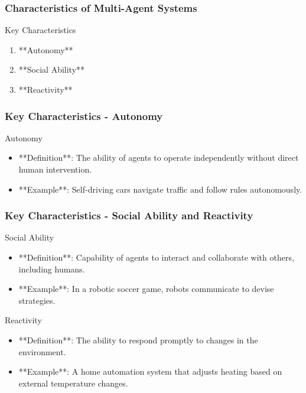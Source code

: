 \documentclass[aspectratio=169]{beamer}
\begin{document}
\begin{frame}[fragile]
    \frametitle{Characteristics of Multi-Agent Systems}
    \begin{block}{Key Characteristics}
        \begin{enumerate}
            \item **Autonomy**
            \item **Social Ability**
            \item **Reactivity**
        \end{enumerate}
    \end{block}
\end{frame}

\begin{frame}[fragile]
    \frametitle{Key Characteristics - Autonomy}
    \begin{block}{Autonomy}
        \begin{itemize}
            \item **Definition**: The ability of agents to operate independently without direct human intervention.
            \item **Example**: Self-driving cars navigate traffic and follow rules autonomously.
        \end{itemize}
    \end{block}
\end{frame}

\begin{frame}[fragile]
    \frametitle{Key Characteristics - Social Ability and Reactivity}
    \begin{block}{Social Ability}
        \begin{itemize}
            \item **Definition**: Capability of agents to interact and collaborate with others, including humans.
            \item **Example**: In a robotic soccer game, robots communicate to devise strategies.
        \end{itemize}
    \end{block}
  
    \begin{block}{Reactivity}
        \begin{itemize}
            \item **Definition**: The ability to respond promptly to changes in the environment.
            \item **Example**: A home automation system that adjusts heating based on external temperature changes.
        \end{itemize}
    \end{block}
\end{frame}
\end{document}
